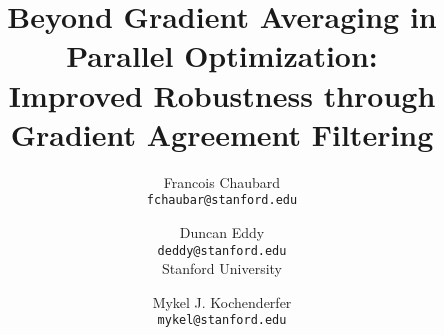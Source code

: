 \documentclass[10pt,twocolumn,letterpaper]{article}
\title{Beyond Gradient Averaging in Parallel Optimization:\\ Improved Robustness through Gradient Agreement Filtering}
\author{Francois Chaubard\\
{\tt\small fchaubar@stanford.edu}
\and
Duncan Eddy\\
{\tt\small deddy@stanford.edu} \\
Stanford University\\
\and
Mykel J. Kochenderfer\\
{\tt\small mykel@stanford.edu}
}
\begin{document}
\maketitle
    







{
    \small
    
    
}

\clearpage 
\appendix 

\end{document}
